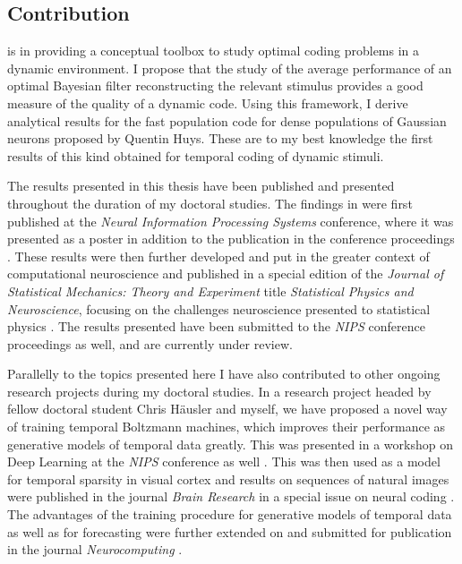 \subsection*{Contribution}

 is in providing a conceptual toolbox to study optimal coding problems in a dynamic environment. I propose that the 
study of the average performance of an optimal Bayesian filter reconstructing the relevant stimulus provides a good measure of the quality of a dynamic code. Using 
this framework, I derive analytical results for the fast population code for dense populations of Gaussian neurons proposed by Quentin Huys.\cite{Huys2007} These are 
to my best knowledge the first results of this kind obtained for temporal coding of dynamic stimuli.\par

The results presented in this thesis have been published and presented throughout the duration of my doctoral studies. The findings in  were first
published at the \emph{Neural Information Processing Systems} conference, where it was presented as a poster in addition to the publication in the conference 
proceedings \citep{Susemihl2011a}. These results were then further developed and put in the greater context of computational neuroscience and published in a special
edition of the \emph{Journal of Statistical Mechanics: Theory and Experiment} title \emph{Statistical Physics and Neuroscience}, focusing on the challenges 
neuroscience presented to statistical physics \citep{Susemihl2012a}. The results presented  have been submitted to the \emph{NIPS} conference
proceedings as well, and are currently under review.\par

Parallelly to the topics presented here I have also contributed to other ongoing research projects during my doctoral studies. In a research project headed by 
fellow doctoral student Chris H\"ausler and myself, we have proposed a novel way of training temporal Boltzmann machines, which improves their performance as
generative models of temporal data greatly. This was presented in a workshop on Deep Learning at the \emph{NIPS} conference as well \citep{hausler2012b}. This was
then used as a model for temporal sparsity in visual cortex and results on sequences of natural images were published in the journal \emph{Brain Research} in a
special issue on neural coding \citep{Hausler2013a}. The advantages of the training procedure for generative models of temporal data as well as for forecasting were
further extended on and submitted for publication in the journal \emph{Neurocomputing} \citep{Hausler2013b}.\par


